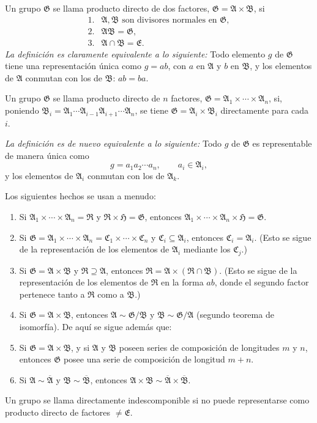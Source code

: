 \documentclass[11pt]{article}
\providecommand{\mG}{\mathfrak{G}}
\providecommand{\mA}{\mathfrak{A}}
\providecommand{\mB}{\mathfrak{B}}
\providecommand{\mC}{\mathfrak{C}}
\providecommand{\mE}{\mathfrak{E}}
\providecommand{\mH}{\mathfrak{H}}
\providecommand{\mR}{\mathfrak{R}}
\begin{document}
Un grupo $\mG$ se llama producto directo de dos factores, $\mG=\mA\times\mB$, si
\[
\begin{array}{ll}
1.& \mA,\mB\text{ son divisores normales en }\mG,\\
2.& \mA\mB=\mG,\\
3.& \mA\cap\mB=\mE.
\end{array}
\]
\emph{La definición es claramente equivalente a lo siguiente:} Todo elemento $g$ de $\mG$ tiene una representación única como $g=ab$, con $a$ en $\mA$ y $b$ en $\mB$, y los elementos de $\mA$ conmutan con los de $\mB$: $ab=ba$.

Un grupo $\mG$ se llama producto directo de $n$ factores, $\mG=\mA_1\times\cdots\times\mA_n$, si, poniendo $\mB_i=\mA_1\cdots\mA_{i-1}\mA_{i+1}\cdots\mA_n$, se tiene $\mG=\mA_i\times\mB_i$ directamente para cada $i$.

\emph{La definición es de nuevo equivalente a lo siguiente:} Todo $g$ de $\mG$ es representable de manera única como
\[
        g=a_1a_2\cdots a_n,\qquad a_i\in\mA_i,
\]
y los elementos de $\mA_i$ conmutan con los de $\mA_k$.

Los siguientes hechos se usan a menudo:
\begin{enumerate}
\item Si $\mA_1\times\cdots\times\mA_n=\mR$ y $\mR\times\mH=\mG$, entonces $\mA_1\times\cdots\times\mA_n\times\mH=\mG$.
\item Si $\mG=\mA_1\times\cdots\times\mA_n=\mC_1\times\cdots\times\mC_n$ y $\mC_i\subseteq\mA_i$, entonces $\mC_i=\mA_i$. (Esto se sigue de la representación de los elementos de $\mA_i$ mediante los $\mC_j$.)
\item Si $\mG=\mA\times\mB$ y $\mR\supseteq\mA$, entonces $\mR=\mA\times(\mR\cap\mB)$. (Esto se sigue de la representación de los elementos de $\mR$ en la forma $ab$, donde el segundo factor pertenece tanto a $\mR$ como a $\mB$.)
\item Si $\mG=\mA\times\mB$, entonces $\mA\sim\mG/\mB$ y $\mB\sim\mG/\mA$ (segundo teorema de isomorfía). De aquí se sigue además que:
\item Si $\mG=\mA\times\mB$, y si $\mA$ y $\mB$ poseen series de composición de longitudes $m$ y $n$, entonces $\mG$ posee una serie de composición de longitud $m+n$.
\item Si $\mA\sim\overline{\mA}$ y $\mB\sim\overline{\mB}$, entonces $\mA\times\mB\sim\overline{\mA}\times\overline{\mB}$.
\end{enumerate}
Un grupo se llama directamente indescomponible si no puede representarse como producto directo de factores $\ne\mE$.
\end{document}

